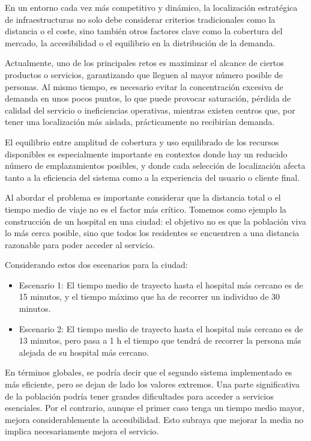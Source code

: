 \documentclass[12pt,a4paper]{book}
\begin{document}
En un entorno cada vez más competitivo y dinámico, la localización estratégica de infraestructuras no solo debe considerar criterios tradicionales como la distancia o el coste, sino también otros factores clave como la cobertura del mercado, la accesibilidad o el equilibrio en la distribución de la demanda.

Actualmente, uno de los principales retos es maximizar el alcance de ciertos productos o servicios, garantizando que lleguen al mayor número posible de personas. Al mismo tiempo, es necesario evitar la concentración excesiva de demanda en unos pocos puntos, lo que puede provocar saturación, pérdida de calidad del servicio o ineficiencias operativas, mientras existen centros que, por tener una localización más aislada, prácticamente no recibirían demanda.

El equilibrio entre amplitud de cobertura y uso equilibrado de los recursos disponibles es especialmente importante en contextos donde hay un reducido número de emplazamientos posibles, y donde cada selección de localización afecta tanto a la eficiencia del sistema como a la experiencia del usuario o cliente final.

Al abordar el problema es importante considerar que la distancia total o el tiempo medio de viaje no es el factor más crítico. 
Tomemos como ejemplo la construcción de un hospital en una ciudad: el objetivo no es que la población viva lo más cerca posible, sino que todos los residentes se encuentren a una distancia razonable para poder acceder al servicio.

Considerando estos dos escenarios para la ciudad:

\begin{itemize}
    \item Escenario 1: El tiempo medio de trayecto hasta el hospital más cercano es de 15 minutos, y el tiempo máximo que ha de recorrer un individuo de 30 minutos.
    \item Escenario 2: El tiempo medio de trayecto hasta el hospital más cercano es de 13 minutos, pero pasa a 1 h el tiempo que tendrá de recorrer la persona más alejada de su hospital más cercano.
\end{itemize} 

En términos globales, se podría decir que el segundo sistema implementado es más eficiente, pero se dejan de lado los valores extremos.
Una parte significativa de la población podría tener grandes dificultades para acceder a servicios esenciales.
Por el contrario, aunque el primer caso tenga un tiempo medio mayor, mejora considerablemente la accesibilidad. Esto subraya que mejorar la media no implica necesariamente mejora el servicio.
\newpage
\end{document}
